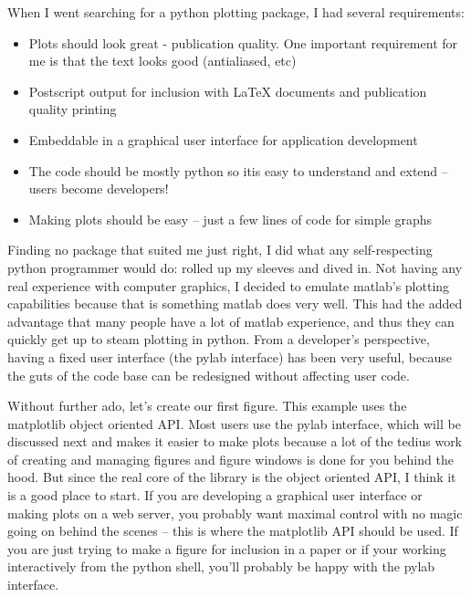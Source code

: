 When I went searching for a python plotting package, I had several
requirements: 

\begin{itemize}
\item Plots should look great - publication quality. One important requirement
for me is that the text looks good (antialiased, etc)
\item Postscript output for inclusion with \LaTeX{} documents and publication
quality printing
\item Embeddable in a graphical user interface for application development
\item The code should be mostly python so itis easy to understand and extend
-- users become developers!
\item Making plots should be easy -- just a few lines of code for simple
graphs
\end{itemize}
Finding no package that suited me just right, I did what any self-respecting
python programmer would do: rolled up my sleeves and dived in. Not
having any real experience with computer graphics, I decided to emulate
matlab's plotting capabilities because that is something matlab does
very well. This had the added advantage that many people have a lot
of matlab experience, and thus they can quickly get up to steam plotting
in python. From a developer's perspective, having a fixed user interface
(the pylab interface) has been very useful, because the guts of the
code base can be redesigned without affecting user code. 

Without further ado, let's create our first figure. This example uses
the matplotlib object oriented API. Most users use the pylab interface,
which will be discussed next and makes it easier to make plots because
a lot of the tedius work of creating and managing figures and figure
windows is done for you behind the hood. But since the real core of
the library is the object oriented API, I think it is a good place
to start. If you are developing a graphical user interface or making
plots on a web server, you probably want maximal control with no magic
going on behind the scenes -- this is where the matplotlib API should
be used. If you are just trying to make a figure for inclusion in
a paper or if your working interactively from the python shell, you'll
probably be happy with the pylab interface.



